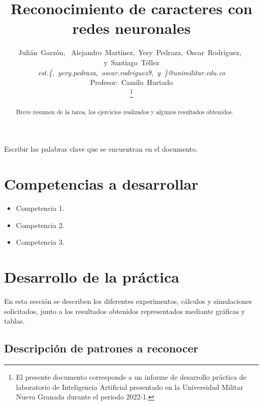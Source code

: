 \documentclass[journal]{IEEEtran}
\begin{document}
\title{Reconocimiento de caracteres con redes neuronales}

\author{Julián~Garzón,~
        Alejandro~Martínez,~Yery~Pedraza,~Oscar~Rodríguez,~
        y~Santiago~Téllez\\
				\textit{est.\{,~yery.pedraza,~oscar.rodriguez9,~y~\}@unimilitar.edu.co}\\
				Profesor:~Camilo~Hurtado\\%
\thanks{El presente documento corresponde a un informe de desarrollo práctica de laboratorio de Inteligencia Artificial presentado en la Universidad Militar Nueva Granada durante el periodo 2022-1.}} %

\maketitle

\begin{abstract}
Breve resumen de la tarea, los ejercicios realizados y algunos resultados obtenidos.
\end{abstract}

\begin{IEEEkeywords}
Escribir las palabras clave que se encuentran en el documento.
\end{IEEEkeywords}


\section{Competencias a desarrollar}
\begin{itemize}
\item Competencia 1.
\item Competencia 2.
\item Competencia 3.
\end{itemize}


\section{Desarrollo de la práctica}
En esta sección se describen los diferentes experimentos, cálculos y simulaciones solicitados, junto a los resultados obtenidos representados mediante gráficas y tablas.

\subsection{Descripción de patrones a reconocer}
\end{document}
